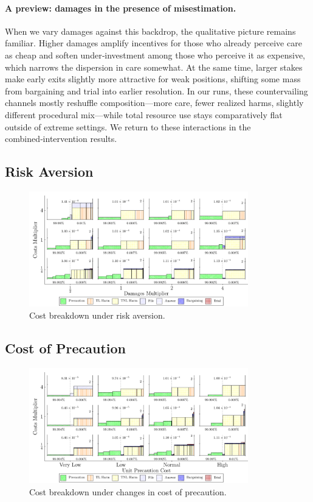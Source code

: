 \documentclass{article}
\begin{document}
\paragraph{A preview: damages in the presence of misestimation.}
When we vary damages against this backdrop, the qualitative picture remains familiar. Higher damages amplify incentives for those who already perceive care as cheap and soften under‑investment among those who perceive it as expensive, which narrows the dispersion in care somewhat. At the same time, larger stakes make early exits slightly more attractive for weak positions, shifting some mass from bargaining and trial into earlier resolution. In our runs, these countervailing channels mostly reshuffle composition—more care, fewer realized harms, slightly different procedural mix—while total resource use stays comparatively flat outside of extreme settings. We return to these interactions in the combined‑intervention results.


\FloatBarrier
\subsection{Risk Aversion}
\begin{figure}[ht]
  \centering
  \includegraphics[width=0.85\textwidth]{../Figures/Cost Breakdown Damages Multiplier (Risk Averse) (All Rows).pdf}
  \caption{Cost breakdown under risk aversion.}
  \label{fig:risk_aversion}
\end{figure}

\FloatBarrier
\subsection{Cost of Precaution}
\begin{figure}[ht]
  \centering
  \includegraphics[width=0.85\textwidth]{../Figures/Cost Breakdown Unit Precaution Cost (All Rows).pdf}
  \caption{Cost breakdown under changes in cost of precaution.}
  \label{fig:cost_precaution}
\end{figure}
\end{document}
